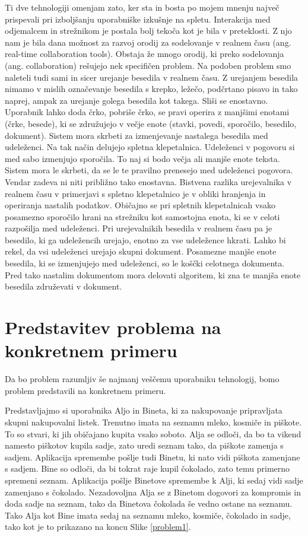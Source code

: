 \documentclass[a4paper, 12pt, twoside]{book}
\begin{document}
Ti dve tehnologiji omenjam zato, ker sta in bosta po mojem mnenju največ prispevali pri izboljšanju uporabniške izkušnje na spletu. Interakcija med odjemalcem in strežnikom je postala bolj tekoča kot je bila v preteklosti. Z njo nam je bila dana možnost za razvoj orodij za sodelovanje v realnem času (ang. real-time collaboration tools). Obstaja že mnogo orodij, ki preko sodelovanja (ang. collaboration) rešujejo nek specifičen problem. Na podoben problem smo naleteli tudi sami in sicer urejanje besedila v realnem času. Z urejanjem besedila nimamo v mislih označevanje besedila s krepko, ležečo, podčrtano pisavo in tako naprej, ampak za urejanje golega besedila kot takega. Sliši se enostavno. Uporabnik lahko doda črko, pobriše črko, se pravi operira z manjšimi enotami (črke, besede), ki se združujejo v večje enote (stavki, povedi, sporočilo, besedilo, dokument). Sistem mora skrbeti za izmenjevanje nastalega besedila med udeleženci. Na tak način delujejo spletna klepetalnica. Udeleženci v pogovoru si med sabo izmenjujo sporočila. To naj si bodo večja ali manjše enote teksta. Sistem mora le skrbeti, da se le te pravilno prenesejo med udeleženci pogovora. Vendar zadeva ni niti približno tako enostavna. Bistvena razlika urejevalnika v realnem času v primerjavi s spletno klepetalnico je v obliki hranjenja in operiranja nastalih podatkov. Običajno se pri spletnih klepetalnicah vsako posamezno sporočilo hrani na strežniku kot samostojna enota, ki se v celoti razpošilja med udeleženci. Pri urejevalnikih besedila v realnem času pa je besedilo, ki ga udeležencih urejajo, enotno za vse udeležence hkrati. Lahko bi rekel, da vsi udeleženci urejajo skupni dokument. Posamezne manjše enote besedila, ki se izmenjujejo med udeleženci, so le koščki celotnega dokumenta. Pred tako nastalim dokumentom mora delovati algoritem, ki zna te manjša enote besedila združevati v dokument.

\section{Predstavitev problema na konkretnem primeru}

Da bo problem razumljiv še najmanj veščemu uporabniku tehnologij, bomo problem predstavili na konkretnem primeru.

Predstavljajmo si uporabnika Aljo in Bineta, ki za nakupovanje pripravljata skupni nakupovalni listek. Trenutno imata na seznamu mleko, kosmiče in piškote. To so stvari, ki jih običajano kupita vsako soboto. Alja se odloči, da bo ta vikend namesto piškotov kupila sadje, zato uredi seznam tako, da piškote zamenja s sadjem. Aplikacija spremembe pošlje tudi Binetu, ki nato vidi piškota zamenjane s sadjem. Bine so odloči, da bi tokrat raje kupil čokolado, zato temu primerno spremeni seznam. Aplikacija pošlje Binetove spremembe k Alji, ki sedaj vidi sadje zamenjano s čokolado. Nezadovoljna Alja se z Binetom dogovori za kompromis in doda sadje na seznam, tako da Binetova čokolada še vedno ostane na seznamu. Tako Alja kot Bine imata sedaj na seznamu mleko, kosmiče, čokolado in sadje, tako kot je to prikazano na koncu Slike \ref{problem1}.
\end{document}
